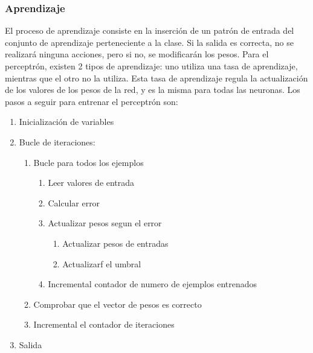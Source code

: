\subsubsection{Aprendizaje}
El proceso de aprendizaje consiste en la inserción de un patrón de entrada del conjunto de aprendizaje perteneciente a la clase. Si la salida es correcta, no se realizará ninguna acciones, pero si no, se modificarán los pesos.
Para el perceptrón, existen 2 tipos de aprendizaje: uno utiliza una tasa de aprendizaje, mientras que el otro no la utiliza. Esta tasa de aprendizaje regula la actualización de los valores de los pesos de la red, y es la misma para todas las neuronas. Los pasos a seguir para entrenar el perceptrón son:
\begin{enumerate}
\item Inicialización de variables
\item Bucle de iteraciones:
\begin{enumerate}
\item Bucle para todos los ejemplos
\begin{enumerate}
\item Leer valores de entrada
\item Calcular error
\item Actualizar pesos segun el error
\begin{enumerate}
\item Actualizar pesos de entradas
\item Actualizarf el umbral
\end{enumerate}
\item Incremental contador de numero de ejemplos entrenados
\end{enumerate}
\item Comprobar que el vector de pesos es correcto
\item Incremental el contador de iteraciones
\end{enumerate}
\item Salida
\end{enumerate}

